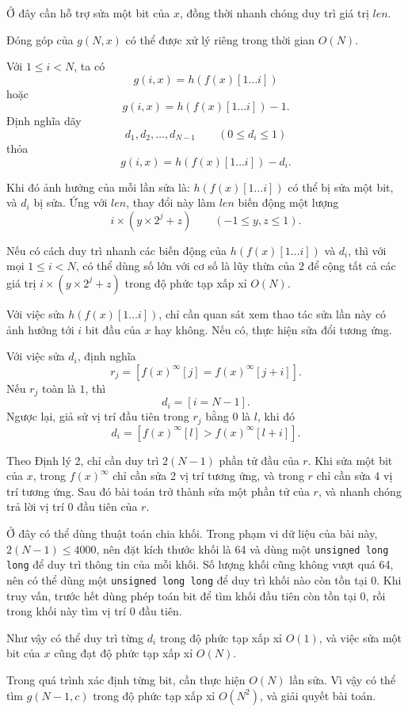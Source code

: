 \documentclass[11pt]{article}
\begin{document}
Ở đây cần hỗ trợ sửa một bit của \(x\), đồng thời nhanh chóng duy trì giá trị
\(\mathit{len}\).

Đóng góp của \(g(N,x)\) có thể được xử lý riêng trong thời gian \(O(N)\).

Với \(1\le i<N\), ta có
\[
g(i,x)=h(f(x)[1\ldots i])
\]
hoặc
\[
g(i,x)=h(f(x)[1\ldots i])-1.
\]
Định nghĩa dãy
\[
d_1,d_2,\ldots,d_{N-1}\qquad(0\le d_i\le 1)
\]
thỏa
\[
g(i,x)=h(f(x)[1\ldots i])-d_i.
\]

Khi đó ảnh hưởng của mỗi lần sửa là: \(h(f(x)[1\ldots i])\) có thể bị sửa một
bit, và \(d_i\) bị sửa. Ứng với \(\mathit{len}\), thay đổi này làm
\(\mathit{len}\) biến động một lượng
\[
i\times(y\times 2^j+z)\qquad(-1\le y,z\le 1).
\]

Nếu có cách duy trì nhanh các biến động của \(h(f(x)[1\ldots i])\) và \(d_i\),
thì với mọi \(1\le i<N\), có thể dùng số lớn với cơ số là lũy thừa của \(2\)
để cộng tất cả các giá trị \(i\times(y\times 2^j+z)\) trong độ phức tạp xấp xỉ
\(O(N)\).

Với việc sửa \(h(f(x)[1\ldots i])\), chỉ cần quan sát xem thao tác sửa lần này
có ảnh hưởng tới \(i\) bit đầu của \(x\) hay không. Nếu có, thực hiện sửa đổi
tương ứng.

Với việc sửa \(d_i\), định nghĩa
\[
r_j=\left[f(x)^\infty[j]=f(x)^\infty[j+i]\right].
\]
Nếu \(r_j\) toàn là \(1\), thì
\[
d_i=[i=N-1].
\]
Ngược lại, giả sử vị trí đầu tiên trong \(r_j\) bằng \(0\) là \(l\), khi đó
\[
d_i=\left[f(x)^\infty[l]>f(x)^\infty[l+i]\right].
\]

Theo Định lý 2, chỉ cần duy trì \(2(N-1)\) phần tử đầu của \(r\). Khi sửa một
bit của \(x\), trong \(f(x)^\infty\) chỉ cần sửa 2 vị trí tương ứng, và trong
\(r\) chỉ cần sửa 4 vị trí tương ứng. Sau đó bài toán trở thành sửa một phần tử
của \(r\), và nhanh chóng trả lời vị trí \(0\) đầu tiên của \(r\).

Ở đây có thể dùng thuật toán chia khối. Trong phạm vi dữ liệu của bài này,
\(2(N-1)\le 4000\), nên đặt kích thước khối là 64 và dùng một
\texttt{unsigned long long} để duy trì thông tin của mỗi khối. Số lượng khối
cũng không vượt quá 64, nên có thể dùng một \texttt{unsigned long long} để duy
trì khối nào còn tồn tại \(0\). Khi truy vấn, trước hết dùng phép toán bit để
tìm khối đầu tiên còn tồn tại \(0\), rồi trong khối này tìm vị trí \(0\) đầu
tiên.

Như vậy có thể duy trì từng \(d_i\) trong độ phức tạp xấp xỉ \(O(1)\), và việc
sửa một bit của \(x\) cũng đạt độ phức tạp xấp xỉ \(O(N)\).

Trong quá trình xác định từng bit, cần thực hiện \(O(N)\) lần sửa. Vì vậy có
thể tìm \(g(N-1,c)\) trong độ phức tạp xấp xỉ \(O(N^2)\), và giải quyết bài
toán.
\end{document}
